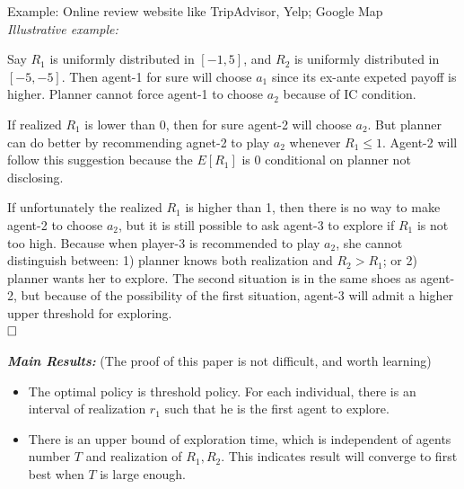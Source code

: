 \documentclass{book}
\theoremstyle{plain}
\theoremstyle{definition}
\begin{document}
Example: Online review website like TripAdvisor, Yelp; Google Map\\

\noindent
\textit{Illustrative example:}

Say $R_1$ is uniformly distributed in $[-1,5]$, and $R_2$ is uniformly distributed in $[-5,-5]$.
Then agent-1 for sure will choose $a_1$ since its ex-ante expeted payoff is higher.
Planner cannot force agent-1 to choose $a_2$ because of IC condition.

If realized $R_1$ is lower than 0, then for sure agent-2 will choose $a_2$.
But planner can do better by recommending agnet-2 to play $a_2$ whenever $R_1 \leq 1$.
Agent-2 will follow this suggestion because the $E[R_1]$ is 0 conditional on planner not disclosing.

If unfortunately the realized $R_1$ is higher than 1, then there is no way to make agent-2 to choose $a_2$,
but it is still possible to ask agent-3 to explore if $R_1$ is not too high.
Because when player-3 is recommended to play $a_2$, she cannot distinguish between:
1) planner knows both realization and $R_2>R_1$;
or 2) planner wants her to explore.
The second situation is in the same shoes as agent-2,
but because of the possibility of the first situation,
agent-3 will admit a higher upper threshold for exploring.\\
$\hfill\square$

\vspace{2mm}
\noindent
\textit{\textbf{Main Results:}}
(The proof of this paper is not difficult, and worth learning)
\begin{itemize}
	\item The optimal policy is threshold policy. For each individual, there is an interval of realization $r_1$ such that he is the first agent to explore.
	\item There is an upper bound of exploration time, which is independent of agents number $T$ and realization of $R_1,R_2$.
	This indicates result will converge to first best when $T$ is large enough.
\end{itemize}
\end{document}
